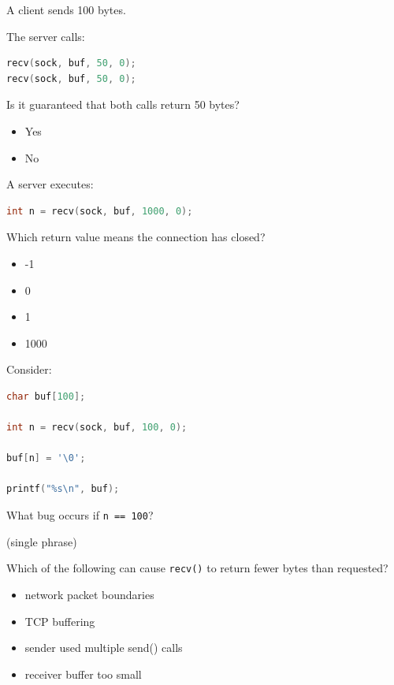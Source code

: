 \begin{questions}
	A client sends 100 bytes.

	The server calls:

	\begin{lstlisting}[language=C]
recv(sock, buf, 50, 0);
recv(sock, buf, 50, 0);
\end{lstlisting}

	Is it guaranteed that both calls return 50 bytes?

	\begin{itemize}
		\item Yes
		\item No
	\end{itemize}

	\question[10]

	A server executes:

	\begin{lstlisting}[language=C]
int n = recv(sock, buf, 1000, 0);
\end{lstlisting}

	Which return value means the connection has closed?

	\begin{itemize}
		\item -1
		\item 0
		\item 1
		\item 1000
	\end{itemize}

	\question[12]

	Consider:

	\begin{lstlisting}[language=C]
char buf[100];

int n = recv(sock, buf, 100, 0);

buf[n] = '\0';

printf("%s\n", buf);
\end{lstlisting}

	What bug occurs if \texttt{n == 100}?

	(single phrase)

	\vspace{2cm}

	\question[12]

	Which of the following can cause \texttt{recv()} to return fewer bytes than requested?

	\begin{itemize}
		\item network packet boundaries
		\item TCP buffering
		\item sender used multiple send() calls
		\item receiver buffer too small
	\end{itemize}


\end{questions}
